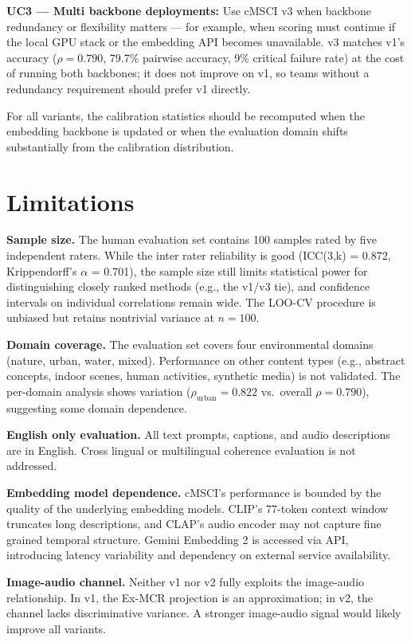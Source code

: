 \textbf{UC3 --- Multi backbone deployments:} Use cMSCI v3 when backbone redundancy or flexibility matters — for example, when scoring must continue if the local GPU stack or the embedding API becomes unavailable. v3 matches v1's accuracy ($\rho = 0.790$, 79.7\% pairwise accuracy, 9\% critical failure rate) at the cost of running both backbones; it does not improve on v1, so teams without a redundancy requirement should prefer v1 directly.

For all variants, the calibration statistics should be recomputed when the embedding backbone is updated or when the evaluation domain shifts substantially from the calibration distribution.

\section{Limitations}\label{sec:limitations}

\textbf{Sample size.} The human evaluation set contains 100 samples rated by five independent raters. While the inter rater reliability is good (ICC(3,k) = 0.872, Krippendorff's $\alpha$ = 0.701), the sample size still limits statistical power for distinguishing closely ranked methods (e.g., the v1/v3 tie), and confidence intervals on individual correlations remain wide. The LOO-CV procedure is unbiased but retains nontrivial variance at $n = 100$.

\textbf{Domain coverage.} The evaluation set covers four environmental domains (nature, urban, water, mixed). Performance on other content types (e.g., abstract concepts, indoor scenes, human activities, synthetic media) is not validated. The per-domain analysis shows variation ($\rho_{\mathrm{urban}} = 0.822$ vs.\ overall $\rho = 0.790$), suggesting some domain dependence.

\textbf{English only evaluation.} All text prompts, captions, and audio descriptions are in English. Cross lingual or multilingual coherence evaluation is not addressed.

\textbf{Embedding model dependence.} cMSCI's performance is bounded by the quality of the underlying embedding models. CLIP's 77-token context window truncates long descriptions, and CLAP's audio encoder may not capture fine grained temporal structure. Gemini Embedding 2 is accessed via API, introducing latency variability and dependency on external service availability.

\textbf{Image-audio channel.} Neither v1 nor v2 fully exploits the image-audio relationship. In v1, the Ex-MCR projection is an approximation; in v2, the channel lacks discriminative variance. A stronger image-audio signal would likely improve all variants.


